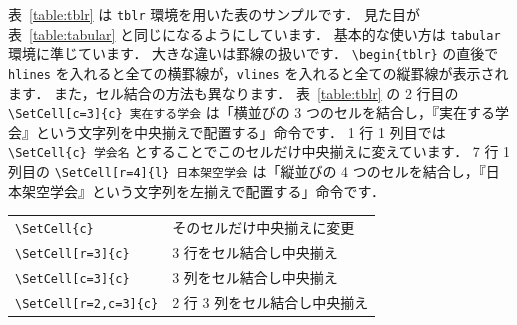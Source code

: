 表~\ref{table:tblr} は \verb|tblr| 環境を用いた表のサンプルです．
見た目が表~\ref{table:tabular} と同じになるようにしています．
基本的な使い方は \verb|tabular| 環境に準じています．
大きな違いは罫線の扱いです．
\verb|\begin{tblr}| の直後で \verb|hlines| を入れると全ての横罫線が，\verb|vlines| を入れると全ての縦罫線が表示されます．
また，セル結合の方法も異なります．
表~\ref{table:tblr} の 2 行目の \verb|\SetCell[c=3]{c} 実在する学会| は「横並びの 3 つのセルを結合し，『実在する学会』という文字列を中央揃えで配置する」命令です．
1 行 1 列目では \verb|\SetCell{c} 学会名| とすることでこのセルだけ中央揃えに変えています．
7 行 1 列目の \verb|\SetCell[r=4]{l} 日本架空学会| は「縦並びの 4 つのセルを結合し，『日本架空学会』という文字列を左揃えで配置する」命令です．

\begin{tcolorbox}[title={\texttt{tblr} 環境でセル結合する際に使用するコマンド}]
    \begin{tabular}{ll}
        \verb|\SetCell{c}|   & そのセルだけ中央揃えに変更 \\
        \verb|\SetCell[r=3]{c}|  & 3 行をセル結合し中央揃え \\
        \verb|\SetCell[c=3]{c}|  & 3 列をセル結合し中央揃え \\
        \verb|\SetCell[r=2,c=3]{c}|  & 2 行 3 列をセル結合し中央揃え \\
    \end{tabular}
\end{tcolorbox}

